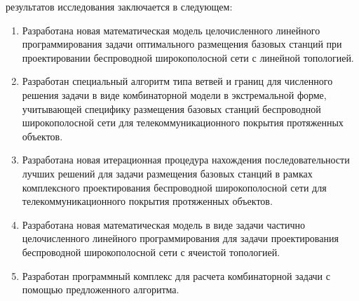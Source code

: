 {\novelty} результатов исследования заключается в следующем:
\begin{enumerate}[beginpenalty=10000] %

    \item Разработана новая математическая модель целочисленного линейного программирования задачи оптимального размещения базовых станций при проектировании беспроводной широкополосной сети с линейной топологией. 
    \item Разработан специальный алгоритм типа ветвей и границ для численного решения задачи в виде комбинаторной модели в экстремальной форме, учитывающей специфику размещения базовых станций беспроводной широкополосной сети для телекоммуникационного покрытия протяженных объектов. 
    \item Разработана новая итерационная процедура нахождения последовательности лучших решений для задачи размещения базовых станций в рамках комплексного проектирования беспроводной широкополосной сети для телекоммуникационного покрытия протяженных объектов.
    \item Разработана новая математическая модель в виде задачи частично целочисленного линейного программирования для задачи проектирования беспроводной широкополосной сети с ячеистой топологией.
    \item Разработан программный комплекс для расчета комбинаторной задачи с помощью предложенного алгоритма.

    


\end{enumerate}
